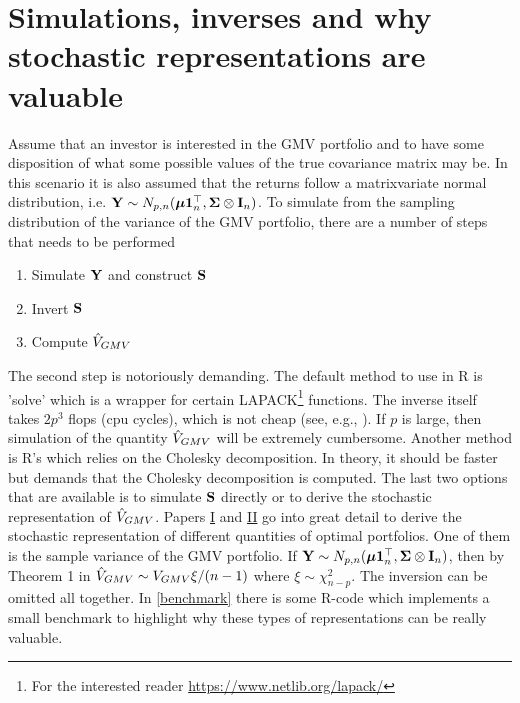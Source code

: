 \documentclass[12pt, twoside]{book}\usepackage{knitr}
\begin{document}
\section{Simulations, inverses and why stochastic representations are valuable}
Assume that an investor is interested in the GMV portfolio and to have some disposition of what some possible values of the true covariance matrix may be.
In this scenario it is also assumed that the returns follow a matrixvariate normal distribution, i.e. $\mathbf{Y} \sim N_{p,n}(\mbox{\boldmath$\mu$} \mathbf{1}_n^\top, \mathbf{\Sigma} \otimes \mathbf{I}_n)$. 
To simulate from the sampling distribution of the variance of the GMV portfolio, there are a number of steps that needs to be performed
\begin{enumerate}
  \item Simulate $\mathbf{Y}$ and construct $\mathbf{S}$
  \item Invert $\mathbf{S}$
  \item Compute $\hat{V}_{GMV}$
\end{enumerate}
The second step is notoriously demanding.
The default method to use in R is 'solve' which is a wrapper for certain LAPACK\footnote{For the interested reader \url{https://www.netlib.org/lapack/}} functions.
The inverse itself takes $2p^3$ flops (cpu cycles), which is not cheap (see, e.g., \cite[ch. 14]{higham2002accuracy}).
If $p$ is large, then simulation of the quantity $\hat{V}_{GMV}$ will be extremely cumbersome.
Another method is R's  which relies on the Cholesky decomposition. 
In theory, it should be faster but demands that the Cholesky decomposition is computed.
The last two options that are available is to simulate $\mathbf{S}$ directly or to derive the stochastic representation of $\hat{V}_{GMV}$.
Papers \hyperref[sec:paper1]{I} and \hyperref[sec:paper2]{II} go into great detail to derive the stochastic representation of different quantities of optimal portfolios. 
One of them is the sample variance of the GMV portfolio.
If $\mathbf{Y} \sim N_{p,n}(\mbox{\boldmath$\mu$} \mathbf{1}_n^\top, \mathbf{\Sigma} \otimes \mathbf{I}_n)$, then by Theorem 1 in \citet{bodnar2020sampling} $\hat{V}_{GMV} \sim V_{GMV}\xi /(n-1)$ where $\xi \sim \chi^2_{n-p}$.
The inversion can be omitted all together.
In \ref{benchmark} there is some R-code which implements a small benchmark to highlight why these types of representations can be really valuable.
\end{document}
